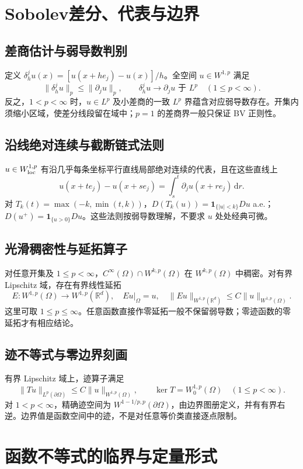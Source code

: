 \documentclass[../main.tex]{subfiles}
\begin{document}
\section{Sobolev差分、代表与边界}\label{sec:ra-sobolev-tools}
\subsection{差商估计与弱导数判别}
定义 $\delta_h^ju(x)=[u(x+he_j)-u(x)]/h$。全空间 $u\in W^{1,p}$ 满足
\[
\|\delta_h^ju\|_p\le\|\partial_ju\|_p,\qquad
\delta_h^ju\to\partial_ju\text{ 于 }L^p\quad(1\le p<\infty).
\]
反之，$1<p<\infty$ 时，$u\in L^p$ 及小差商的一致 $L^p$ 界蕴含对应弱导数存在。开集内须缩小区域，使差分线段留在域中；$p=1$ 的差商界一般只保证 BV 正则性。
\subsection{沿线绝对连续与截断链式法则}
$u\in W^{1,p}_{\rm loc}$ 有沿几乎每条坐标平行直线局部绝对连续的代表，且在这些直线上
\[
u(x+te_j)-u(x+se_j)=\int_s^t\partial_ju(x+re_j)\,\mathrm dr.
\]
对 $T_k(t)=\max(-k,\min(t,k))$，$D(T_k(u))=\bm1_{\{|u|<k\}}Du$ a.e.；$D(u^+)=\bm1_{\{u>0\}}Du$。这些法则按弱导数理解，不要求 $u$ 处处经典可微。
\subsection{光滑稠密性与延拓算子}
对任意开集及 $1\le p<\infty$，$C^\infty(\Omega)\cap W^{k,p}(\Omega)$ 在 $W^{k,p}(\Omega)$ 中稠密。对有界 Lipschitz 域，存在有界线性延拓
\[
E:W^{1,p}(\Omega)\to W^{1,p}(\mathbb R^d),\quad Eu|_\Omega=u,\quad
\|Eu\|_{W^{1,p}(\mathbb R^d)}\le C\|u\|_{W^{1,p}(\Omega)}.
\]
这里可取 $1\le p\le\infty$。任意函数直接作零延拓一般不保留弱导数；零迹函数的零延拓才有相应结论。
\subsection{迹不等式与零边界刻画}
有界 Lipschitz 域上，迹算子满足
\[
\|Tu\|_{L^p(\partial\Omega)}\le C\|u\|_{W^{1,p}(\Omega)},\qquad
\ker T=W_0^{1,p}(\Omega)\quad(1\le p<\infty).
\]
对 $1<p<\infty$，精确迹空间为 $W^{1-1/p,p}(\partial\Omega)$，由边界图册定义，并有有界右逆。边界值是函数空间中的迹，不是对任意等价类直接逐点限制。
\section{函数不等式的临界与定量形式}
\end{document}
